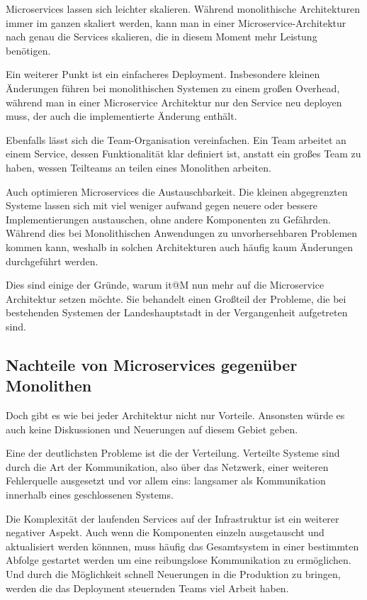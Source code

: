 \documentclass[12pt,a4paper,bibliography=totocnumbered,listof=totocnumbered]{scrartcl}
\begin{document}
Microservices lassen sich leichter skalieren. Während monolithische Architekturen immer im ganzen skaliert werden, kann man in einer Microservice-Architektur nach genau die Services skalieren, die in diesem Moment mehr Leistung benötigen.

Ein weiterer Punkt ist ein einfacheres Deployment. Insbesondere kleinen Änderungen führen bei monolithischen Systemen zu einem großen Overhead, während man in einer Microservice Architektur nur den Service neu deployen muss, der auch die implementierte Änderung enthält.

Ebenfalls lässt sich die Team-Organisation vereinfachen. Ein Team arbeitet an einem Service, dessen Funktionalität klar definiert ist, anstatt ein großes Team zu haben, wessen Teilteams an teilen eines Monolithen arbeiten.

Auch optimieren Microservices die Austauschbarkeit. Die kleinen abgegrenzten Systeme lassen sich mit viel weniger aufwand gegen neuere oder bessere Implementierungen austauschen, ohne andere Komponenten zu Gefährden. Während dies bei Monolithischen Anwendungen zu unvorhersehbaren Problemen kommen kann, weshalb in solchen Architekturen auch häufig kaum Änderungen durchgeführt werden.

Dies sind einige der Gründe, warum it@M nun mehr auf die Microservice Architektur setzen möchte. Sie behandelt einen Großteil der Probleme, die bei bestehenden Systemen der Landeshauptstadt in der Vergangenheit aufgetreten sind.

\subsection{Nachteile von Microservices gegenüber Monolithen}\label{ch:ms-mon-cons}

Doch gibt es wie bei jeder Architektur nicht nur Vorteile. Ansonsten würde es auch keine Diskussionen und Neuerungen auf diesem Gebiet geben.

Eine der deutlichsten Probleme ist die der Verteilung. Verteilte Systeme sind durch die Art der Kommunikation, also über das Netzwerk, einer weiteren Fehlerquelle ausgesetzt und vor allem eins: langsamer als Kommunikation innerhalb eines geschlossenen Systems\cite{tradeoffs}. 

Die Komplexität der laufenden Services auf der Infrastruktur ist ein weiterer negativer Aspekt. Auch wenn die Komponenten einzeln ausgetauscht und aktualisiert werden könnnen, muss häufig das Gesamtsystem in einer bestimmten Abfolge gestartet werden um eine reibungslose Kommunikation zu ermöglichen. Und durch die Möglichkeit schnell Neuerungen in die Produktion zu bringen, werden die das Deployment steuernden Teams viel Arbeit haben.\cite{tradeoffs}
\end{document}

